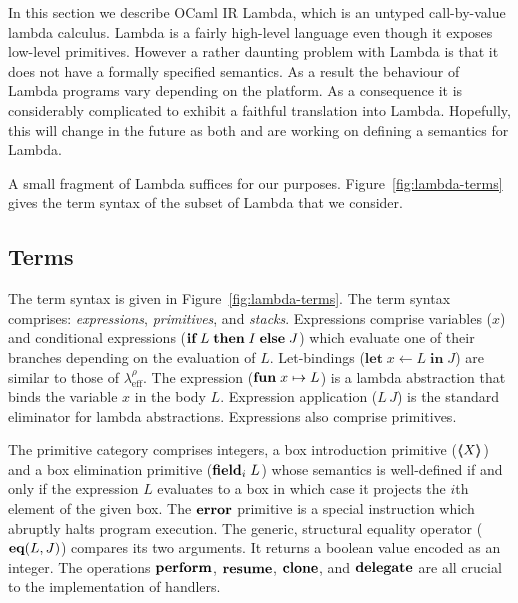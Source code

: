 \documentclass[12pt,mscres,cdtppar,twoside,openright,logo,rightchapter,normalheadings]{infthesis}
\theoremstyle{definition}
\newcommand{\Calc}{\ensuremath{\lambda_{\text{eff}}^\rho}\xspace}
\newcommand{\revto}{\ensuremath{\leftarrow}}
\newcommand{\keyw}[1]{\textbf{#1}}
\newcommand{\Let}{\keyw{let}}
\newcommand{\In}{\keyw{in}}
\begin{document}
In this section we describe OCaml IR Lambda, which is an untyped
call-by-value lambda calculus. Lambda is a fairly high-level language
even though it exposes low-level primitives. However a rather daunting
problem with Lambda is that it does not have a formally specified
semantics. As a result the behaviour of Lambda programs vary depending
on the platform. As a consequence it is considerably complicated to
exhibit a faithful translation into Lambda. Hopefully, this will
change in the future as both \cite{Dolan2016} and \cite{Chambert2016}
are working on defining a semantics for Lambda.

A small fragment of Lambda suffices for our purposes.
Figure~\ref{fig:lambda-terms} gives the term syntax of the subset of
Lambda that we consider.

\subsection{Terms} 
The term syntax is given in Figure~\ref{fig:lambda-terms}. The term
syntax comprises: \emph{expressions}, \emph{primitives}, and
\emph{stacks}. Expressions comprise variables ($x$) and conditional
expressions ($\If\; L \; \Then\; I\; \Else\; J$) which evaluate one of
their branches depending on the evaluation of $L$. Let-bindings
($\Let\; x \revto L\; \In \; J$) are similar to those of \Calc. The
expression ($\Fun \; x \mapsto L$) is a lambda abstraction that binds
the variable $x$ in the body $L$. Expression application ($L\,J$) is
the standard eliminator for lambda abstractions. Expressions also
comprise primitives.

The primitive category comprises integers, a box introduction
primitive ($\langle\!\!\langle X \rangle\!\!\rangle$) and a box elimination primitive ($\Field_i\;L$)
whose semantics is well-defined if and only if the expression $L$
evaluates to a box in which case it projects the $i$th element of the
given box.  The $\Error$ primitive is a special instruction which
abruptly halts program execution. The generic, structural equality
operator ($\Eq(L,J)$) compares its two arguments. It returns a boolean
value encoded as an integer. The operations $\Perform$, $\Resume$,
$\Clone$, and $\Delegate$ are all crucial to the implementation of
handlers.
\end{document}

